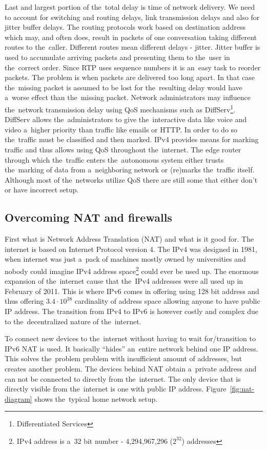 Last and largest portion of the~total delay is time of network delivery. We need to account for switching and routing delays, link transmission delays and also for jitter buffer delays. The routing protocols work based on destination address which may, and often does, result in packets of one conversation taking different routes to the~caller. Different routes mean different delays - jitter. Jitter buffer is used to accumulate arriving packets and presenting them to the~user in the~correct order. Since RTP uses sequence numbers it is an~easy task to reorder packets. The problem is when packets are delivered too long apart. In that case the~missing packet is assumed to be lost for the~resulting delay would have a~worse effect than the~missing packet. Network administrators may influence the~network transmission delay using QoS mechanisms such as DiffServ\footnote{Differentiated Services}. DiffServ allows the~administrators to give the~interactive data like voice and video a~higher priority than traffic like emails or HTTP. In order to do so the~traffic must be classified and then marked. IPv4 provides means for marking traffic and thus allows using QoS throughout the~internet. The edge router through which the~traffic enters the~autonomous system either trusts the~marking of data from a~neighboring network or (re)marks the~traffic itself. Although most of the~networks utilize QoS there are still some that either don't or have incorrect setup.  

\subsection*{Overcoming NAT and firewalls}
First what is Network Address Translation (NAT) and what is it good for. The internet is based on Internet Protocol version 4. The IPv4 was designed in 1981, when internet was just a~pack of machines mostly owned by universities and nobody could imagine IPv4 address space\footnote{IPv4 address is a~32 bit number - 4,294,967,296 ($2^{32}$) addresses} could ever be used up. The enormous expansion of the~internet cause that the~IPv4 addresses were all used up in February of 2011\cite{ianaAddressSpaceReport}. This is where IPv6 comes in offering using 128 bit address and thus offering $3.4\cdot10^{38}$ cardinality of address space allowing anyone to have public IP address. The transition from IPv4 to IPv6 is however costly and complex due to the~decentralized nature of the~internet.  

To connect new devices to the~internet without having to wait for/transition to IPv6 NAT is used. It basically ``hides'' an~entire network behind one IP address. This solves the~problem problem with insufficient amount of addresses, but creates another problem. The devices behind NAT obtain a~private address and can not be connected to directly from the~internet. The only device that is directly visible from the~internet is one with public IP address. Figure~\ref{fig:nat-diagram} shows the~typical home network setup. 

